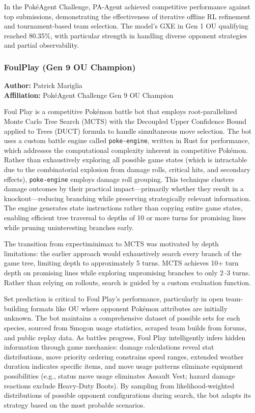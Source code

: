 In the Pok\'eAgent Challenge, PA-Agent achieved competitive performance against top submissions, demonstrating the effectiveness of iterative offline RL refinement and tournament-based team selection. The model's GXE in Gen 1 OU qualifying reached 80.35\%, with particular strength in handling diverse opponent strategies and partial observability.

\subsubsection{FoulPlay (Gen 9 OU Champion)}
\label{sec:foulplay}

\textbf{Author:} Patrick Mariglia~\citep{FoulPlay} \\
\textbf{Affiliation:} PokéAgent Challenge Gen 9 OU Champion

Foul Play is a competitive Pokémon battle bot that employs root-parallelized Monte Carlo Tree Search (MCTS) with the Decoupled Upper Confidence Bound applied to Trees (DUCT) formula to handle simultaneous move selection. The bot uses a custom battle engine called \texttt{poke-engine}, written in Rust for performance, which addresses the computational complexity inherent in competitive Pokémon. Rather than exhaustively exploring all possible game states (which is intractable due to the combinatorial explosion from damage rolls, critical hits, and secondary effects), \texttt{poke-engine} employs damage roll grouping. This technique clusters damage outcomes by their practical impact---primarily whether they result in a knockout---reducing branching while preserving strategically relevant information. The engine generates state instructions rather than copying entire game states, enabling efficient tree traversal to depths of 10 or more turns for promising lines while pruning uninteresting branches early.

The transition from expectiminimax to MCTS was motivated by depth limitations: the earlier approach would exhaustively search every branch of the game tree, limiting depth to approximately 5 turns. MCTS achieves 10+ turn depth on promising lines while exploring unpromising branches to only 2--3 turns. Rather than relying on rollouts, search is guided by a custom evaluation function.

Set prediction is critical to Foul Play's performance, particularly in open team-building formats like OU where opponent Pokémon attributes are initially unknown. The bot maintains a comprehensive dataset of possible sets for each species, sourced from Smogon usage statistics, scraped team builds from forums, and public replay data. As battles progress, Foul Play intelligently infers hidden information through game mechanics: damage calculations reveal stat distributions, move priority ordering constrains speed ranges, extended weather duration indicates specific items, and move usage patterns eliminate equipment possibilities (e.g., status move usage eliminates Assault Vest; hazard damage reactions exclude Heavy-Duty Boots). By sampling from likelihood-weighted distributions of possible opponent configurations during search, the bot adapts its strategy based on the most probable scenarios.

